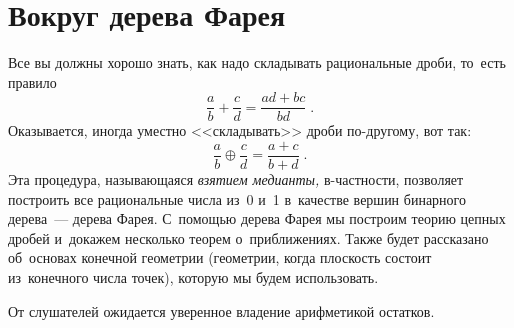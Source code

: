 
\section*{Вокруг дерева Фарея}



Все вы должны хорошо знать, как надо складывать рациональные дроби, то~есть
правило
\[
    \frac{a}{b} + \frac{c}{d}
=
    \frac{a d + b c}{b d}
\; . \]
Оказывается, иногда уместно <<складывать>> дроби по-другому, вот так:
\[
    \frac{a}{b} \oplus \frac{c}{d}
=
    \frac{a + c}{b + d}
\; . \]
Эта процедура, называющаяся \emph{взятием медианты,} в-частности, позволяет
построить все рациональные числа из~0 и~1 в~качестве вершин бинарного
дерева~--- дерева Фарея.
С~помощью дерева Фарея мы построим теорию цепных дробей и~докажем несколько
теорем о~приближениях.
Также будет рассказано об~основах конечной геометрии
(геометрии, когда плоскость состоит из~конечного числа точек),
которую мы будем использовать.

От слушателей ожидается уверенное владение арифметикой остатков.

